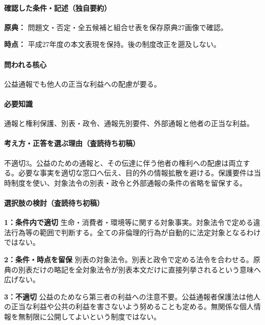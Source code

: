 \paragraph{確認した条件・記述（独自要約）}\mbox{}\par

\noindent\textbf{原典：} 問題文・否定・全五候補と組合せ表を保存原典27画像で確認。\par

\noindent\textbf{時点：} 平成27年度の本文表現を保持。後の制度改正を遡及しない。\par

\paragraph{問われる核心} 公益通報でも他人の正当な利益への配慮が要る。

\paragraph{必要知識} 通報と権利保護、別表・政令、通報先別要件、外部通報と他者の正当な利益。

\paragraph{考え方・正答を選ぶ理由（査読待ち初稿）} 不適切3。公益のための通報と、その伝達に伴う他者の権利への配慮は両立する。必要な事実を適切な窓口へ伝え、目的外の情報拡散を避ける。保護要件は当時制度を使い、対象法令の別表・政令と外部通報の条件の省略を留保する。

\paragraph{選択肢の検討（査読待ち初稿）}\mbox{}\par

\noindent\textbf{1：条件内で適切} 生命・消費者・環境等に関する対象事実。対象法令で定める違法行為等の範囲で判断する。全ての非倫理的行為が自動的に法定対象となるわけではない。\par

\noindent\textbf{2：条件・時点を留保} 別表の対象法令。別表と政令で定める法令を合わせる。原典の別表だけの略記を全対象法令が別表本文だけに直接列挙されるという意味へ広げない。\par

\noindent\textbf{3：不適切} 公益のためなら第三者の利益への注意不要。公益通報者保護法は他人の正当な利益や公共の利益を害さないよう努めることも定める。無関係な個人情報を無制限に公開してよいという制度ではない。\par

